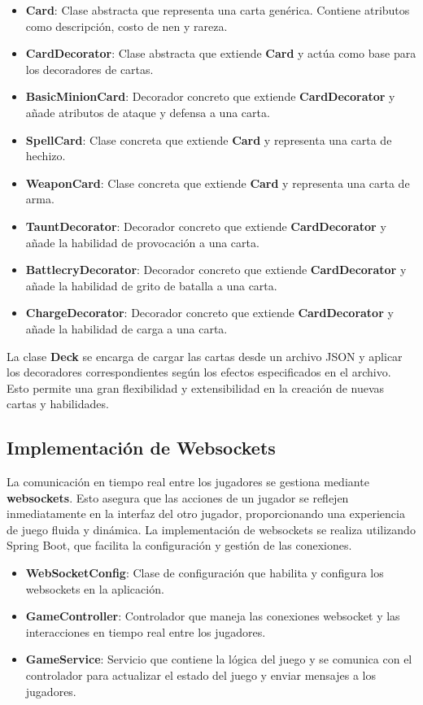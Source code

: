 \documentclass[12pt]{article}
\begin{document}
\begin{itemize}
    \item \textbf{Card}: Clase abstracta que representa una carta genérica. Contiene atributos como descripción, costo de nen y rareza.
    \item \textbf{CardDecorator}: Clase abstracta que extiende \textbf{Card} y actúa como base para los decoradores de cartas.
    \item \textbf{BasicMinionCard}: Decorador concreto que extiende \textbf{CardDecorator} y añade atributos de ataque y defensa a una carta.
    \item \textbf{SpellCard}: Clase concreta que extiende \textbf{Card} y representa una carta de hechizo.
    \item \textbf{WeaponCard}: Clase concreta que extiende \textbf{Card} y representa una carta de arma.
    \item \textbf{TauntDecorator}: Decorador concreto que extiende \textbf{CardDecorator} y añade la habilidad de provocación a una carta.
    \item \textbf{BattlecryDecorator}: Decorador concreto que extiende \textbf{CardDecorator} y añade la habilidad de grito de batalla a una carta.
    \item \textbf{ChargeDecorator}: Decorador concreto que extiende \textbf{CardDecorator} y añade la habilidad de carga a una carta.
\end{itemize}

La clase \textbf{Deck} se encarga de cargar las cartas desde un archivo JSON y aplicar los decoradores correspondientes según los efectos especificados en el archivo. Esto permite una gran flexibilidad y extensibilidad en la creación de nuevas cartas y habilidades.

\subsection*{Implementación de Websockets}
La comunicación en tiempo real entre los jugadores se gestiona mediante \textbf{websockets}. Esto asegura que las acciones de un jugador se reflejen inmediatamente en la interfaz del otro jugador, proporcionando una experiencia de juego fluida y dinámica. La implementación de websockets se realiza utilizando Spring Boot, que facilita la configuración y gestión de las conexiones.

\begin{itemize}
    \item \textbf{WebSocketConfig}: Clase de configuración que habilita y configura los websockets en la aplicación.
    \item \textbf{GameController}: Controlador que maneja las conexiones websocket y las interacciones en tiempo real entre los jugadores.
    \item \textbf{GameService}: Servicio que contiene la lógica del juego y se comunica con el controlador para actualizar el estado del juego y enviar mensajes a los jugadores.
\end{itemize}
\end{document}
